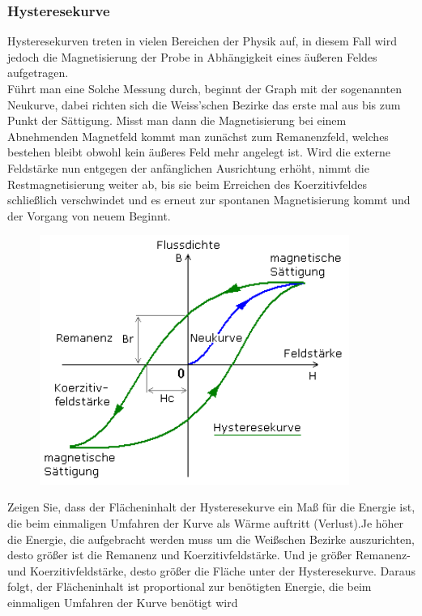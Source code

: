         \subsubsection*{Hysteresekurve}
            Hysteresekurven treten in vielen Bereichen der Physik auf, in diesem Fall wird jedoch die Magnetisierung
            der Probe in Abhängigkeit eines äußeren Feldes aufgetragen.\\
            Führt man eine Solche Messung durch, beginnt der Graph mit der sogenannten Neukurve, dabei richten sich
            die Weiss'schen Bezirke das erste mal aus bis zum Punkt der Sättigung. Misst man dann die Magnetisierung bei einem Abnehmenden Magnetfeld
            kommt man zunächst zum Remanenzfeld, welches bestehen bleibt obwohl kein äußeres Feld mehr angelegt ist. Wird die externe Feldstärke nun entgegen der anfänglichen Ausrichtung erhöht, nimmt die Restmagnetisierung weiter ab, bis
            sie beim Erreichen des Koerzitivfeldes schließlich verschwindet und es erneut zur spontanen Magnetisierung kommt und der Vorgang von neuem Beginnt.
            \begin{figure}[H]
                \centering
                \includegraphics[width=0.9\textwidth]{Images/hyster.png}
            \end{figure}

            Zeigen Sie, dass der Flächeninhalt der Hysteresekurve ein Maß für die Energie ist, die beim einmaligen Umfahren der Kurve als Wärme
            auftritt (Verlust).Je höher die Energie, die aufgebracht werden muss um die Weißschen Bezirke auszurichten, desto größer ist die
            Remanenz und Koerzitivfeldstärke. Und je größer Remanenz- und Koerzitivfeldstärke, desto größer die Fläche unter der Hysteresekurve.
            Daraus folgt, der Flächeninhalt ist proportional zur benötigten Energie, die beim einmaligen Umfahren der Kurve benötigt wird
